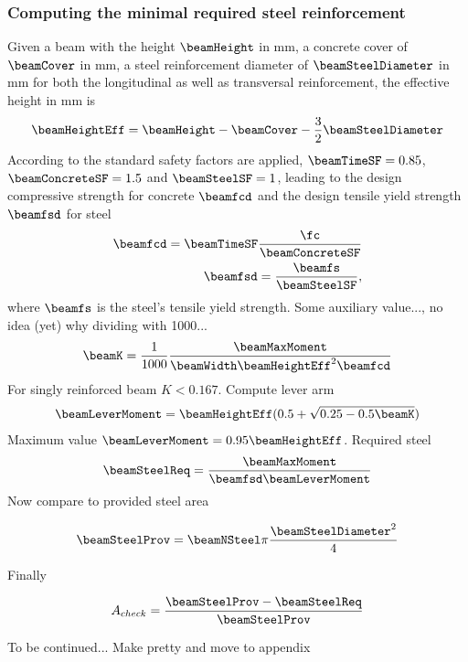 \subsubsection{Computing the minimal required steel reinforcement}
Given a beam with the height $\beamHeight$ in mm, a concrete cover of $\beamCover$ in mm, a steel reinforcement diameter of $\beamSteelDiameter$ in mm for both the longitudinal as well as transversal reinforcement, the effective height in mm is
\begin{align}
	\beamHeightEff = \beamHeight - \beamCover - \frac{3}{2} \beamSteelDiameter
\end{align}
According to the standard safety factors are applied, $\beamTimeSF = 0.85$, $\beamConcreteSF = 1.5$ and $\beamSteelSF = 1$, leading to the design compressive strength for concrete $\beamfcd$ and  the design tensile yield strength $\beamfsd$ for steel
\begin{align}
	\beamfcd = \beamTimeSF \frac{\fc }{\beamConcreteSF}\\
	\beamfsd = \frac{\beamfs}{\beamSteelSF},
\end{align}
where $\beamfs$ is the steel's tensile yield strength.
Some auxiliary value..., no idea (yet) why dividing with 1000...
\begin{align}
	\beamK = \frac{1}{1000} \frac{\beamMaxMoment }{\beamWidth \beamHeightEff^2 \beamfcd}
\end{align}
For singly reinforced beam $K < 0.167$.
Compute lever arm
\begin{align}
\beamLeverMoment = \beamHeightEff(0.5+\sqrt{0.25-0.5 \beamK})
\end{align}
Maximum value $\beamLeverMoment = 0.95\beamHeightEff$.
Required steel
\begin{align}
\beamSteelReq = \frac{\beamMaxMoment}{\beamfsd \beamLeverMoment}
\end{align}
Now compare to provided steel area

\begin{align}
	\beamSteelProv = \beamNSteel \pi \frac{\beamSteelDiameter^2}{4} 
\end{align}

Finally 

\begin{align}
	A_{check} = \frac{\beamSteelProv - \beamSteelReq}{\beamSteelProv}
\end{align}



To be continued...
Make pretty and move to appendix
